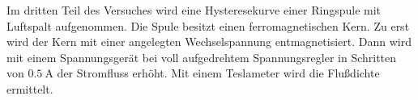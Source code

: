 Im dritten Teil des Versuches wird eine Hysteresekurve einer Ringspule mit Luftspalt aufgenommen. Die Spule besitzt einen ferromagnetischen Kern.
Zu erst wird der Kern mit einer angelegten Wechselspannung entmagnetisiert. Dann wird mit einem Spannungsgerät bei voll aufgedrehtem Spannungsregler in Schritten von 
$\SI{0.5}{\ampere}$ der Stromfluss erhöht. Mit einem Teslameter wird die Flußdichte ermittelt.
\newpage
